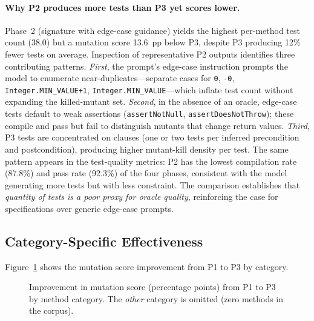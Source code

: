 \paragraph{Why P2 produces more tests than P3 yet scores lower.}
Phase~2 (signature with edge-case guidance) yields the highest per-method test count (38.0) but a mutation score 13.6~pp below P3, despite P3 producing 12\% fewer tests on average. Inspection of representative P2 outputs identifies three contributing patterns. \emph{First}, the prompt's edge-case instruction prompts the model to enumerate near-duplicates---separate cases for \texttt{0}, \texttt{-0}, \texttt{Integer.MIN\_VALUE+1}, \texttt{Integer.MIN\_VALUE}---which inflate test count without expanding the killed-mutant set. \emph{Second}, in the absence of an oracle, edge-case tests default to weak assertions (\texttt{assertNotNull}, \texttt{assertDoesNotThrow}); these compile and pass but fail to distinguish mutants that change return values. \emph{Third}, P3 tests are concentrated on clauses (one or two tests per inferred precondition and postcondition), producing higher mutant-kill density per test. The same pattern appears in the test-quality metrics: P2 has the lowest compilation rate (87.8\%) and pass rate (92.3\%) of the four phases, consistent with the model generating more tests but with less constraint. The comparison establishes that \emph{quantity of tests is a poor proxy for oracle quality}, reinforcing the case for specifications over generic edge-case prompts.

\subsection{Category-Specific Effectiveness}

Figure~\ref{fig:improvement-by-category} shows the mutation score improvement from P1 to P3 by category.

\begin{figure}[ht]
\centering
{}
\caption{Improvement in mutation score (percentage points) from P1 to P3 by method category. The \emph{other} category is omitted (zero methods in the corpus).}
\label{fig:improvement-by-category}
\end{figure}

